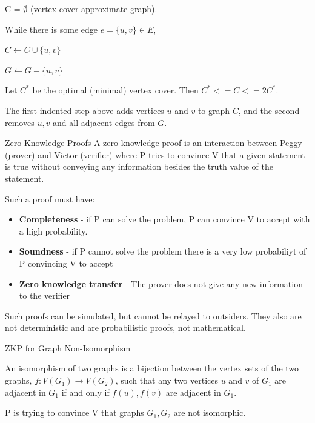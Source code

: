 \documentclass[2pt,legalpaper]{scrartcl}
\makeatletter
\renewcommand{\section}{\@startsection{section}{1}{0mm}
  {-1ex plus -.5ex minus -.2ex}
  {0.5ex plus .2ex}
{\normalfont\large\bfseries}}
\renewcommand{\subsection}{\@startsection{subsection}{2}{0mm}
  {-1explus -.5ex minus -.2ex}
  {0.5ex plus .2ex}
{\normalfont\normalsize\bfseries}}
\makeatother
\begin{document}
\begin{multicols}{6}
  C = $\emptyset$ (vertex cover approximate graph).

  While there is some edge $e = \{u, v\} \in E$,

  \hspace{10px} $C \leftarrow C \cup \{u, v\}$

  \hspace{10px} $G \leftarrow G - \{u, v\}$

  Let $C^*$ be the optimal (minimal) vertex cover. Then $C^* <= C <= 2C^*$.

  The first indented step above adds vertices $u$ and $v$ to graph $C$, and the second removes $u, v$ and all adjacent edges from $G$.

  \section{Zero Knowledge Proofs}
  A zero knowledge proof is an interaction between Peggy (prover) and Victor (verifier) where P tries to convince V that a given statement is true without conveying any information besides the truth value of the statement.

  Such a proof must have:

  \begin{itemize}
    \item {\bf Completeness} - if P can solve the problem, P can convince V to accept with a high probability.
    \item {\bf Soundness} - if P cannot solve the problem there is a very low probabiliyt of P convincing V to accept
    \item {\bf Zero knowledge transfer} - The prover does not give any new information to the verifier
  \end{itemize}

  Such proofs can be simulated, but cannot be relayed to outsiders. They also are not deterministic and are probabilistic proofs, not mathematical.

  \subsection{ZKP for Graph Non-Isomorphism}

  An isomorphism of two graphs is a bijection between the vertex sets of the two graphs, $f: V(G_1) \rightarrow V(G_2)$, such that any two vertices $u$ and $v$ of $G_1$ are adjacent in $G_1$ if and only if $f(u), f(v)$ are adjacent in $G_1$.

  P is trying to convince V that graphs $G_1, G_2$ are not isomorphic.


\end{multicols}
\end{document}
